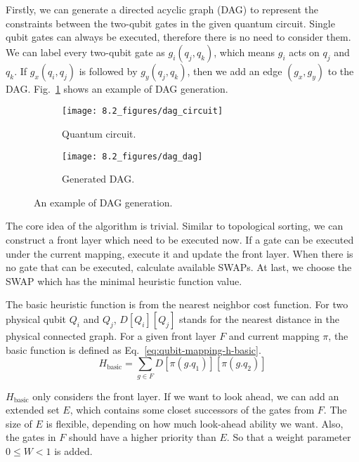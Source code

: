 Firstly, we can generate a directed acyclic graph (DAG) to represent the constraints between the two-qubit gates in the given quantum circuit. Single qubit gates can always be executed, therefore there is no need to consider them. We can label every two-qubit gate as $g_i(q_j, q_k)$, which means $g_i$ acts on $q_j$ and $q_k$. If $g_x(q_i, q_j)$ is followed by $g_y(q_j, q_k)$, then we add an edge $(g_x, g_y)$ to the DAG. Fig.~\ref{fig:qubit-mapping-dag} shows an example of DAG generation.

\begin{figure}
	\centering
	\begin{subfigure}{0.49\textwidth}
		\centering
		\texttt{[image: 8.2\_figures/dag\_circuit]}
        \caption{Quantum circuit.}
	\end{subfigure}
	\begin{subfigure}{0.49\textwidth}
		\centering
		\texttt{[image: 8.2\_figures/dag\_dag]}
        \caption{Generated DAG.}
	\end{subfigure}
	\caption{An example of DAG generation.}
	\label{fig:qubit-mapping-dag}
\end{figure}

The core idea of the algorithm is trivial. Similar to topological sorting, we can construct a front layer which need to be executed now. If a gate can be executed under the current mapping, execute it and update the front layer. When there is no gate that can be executed, calculate available SWAPs. At last, we choose the SWAP which has the minimal heuristic function value.

The basic heuristic function is from the nearest neighbor cost function. For two physical qubit $Q_i$ and $Q_j$, $D[Q_i][Q_j]$ stands for the nearest distance in the physical connected graph. For a given front layer $F$ and current mapping $\pi$, the basic function is defined as 
Eq.~\eqref{eq:qubit-mapping-h-basic}.
\begin{equation} \label{eq:qubit-mapping-h-basic}
	H_{\text{basic}} = \sum_{g \in F} D[\pi (g.q_1)][\pi (g.q_2)]
\end{equation}

$H_{\text{basic}}$ only considers the front layer. If we want to look ahead, we can add an extended set $E$, which contains some closet successors of the gates from $F$. The size of $E$ is flexible, depending on how much look-ahead ability we want. Also, the gates in $F$ should have a higher priority than $E$. So that a weight parameter $0 \leq W < 1$ is added.

